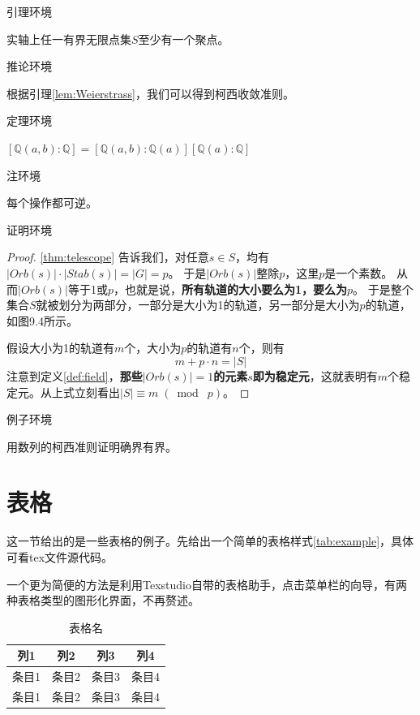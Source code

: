 引理环境
\begin{lemma}\rm{\cite{Azizov2003On}}\label{lem:Weierstrass}
	实轴上任一有界无限点集$S$至少有一个聚点。
\end{lemma}

推论环境
\begin{corollary}
	根据引理\ref{lem:Weierstrass}，我们可以得到柯西收敛准则。
\end{corollary}

定理环境
\begin{theorem}[望远镜公式]\label{thm:telescope}
	$\left[\mathbb{Q}(a, b) : \mathbb{Q}\right]=\left[\mathbb{Q}(a, b) : \mathbb{Q}(a)\right]\left[\mathbb{Q}(a) : \mathbb{Q}\right] $
\end{theorem}

注环境
\begin{remark}\label{rem:reversible}
	每个操作都可逆。
\end{remark}

证明环境
\begin{proof}
	\autoref{thm:telescope} 告诉我们，对任意$s\in S$，均有$\lvert Orb(s)\rvert \cdot \lvert Stab(s)\rvert=\lvert G\rvert=p$。 于是$\lvert Orb(s)\rvert $整除$p$，这里$p$是一个素数。
	从而$\lvert Orb(s)\rvert $等于1或$p$，也就是说，\textbf{所有轨道的大小要么为1，要么为$p$}。
	于是整个集合$S$就被划分为两部分，一部分是大小为1的轨道，另一部分是大小为$p$的轨道，如图9.4所示。
	
	假设大小为1的轨道有$m$个，大小为$p$的轨道有$n$个，则有
	\begin{equation}
		m+p\cdot n=\lvert S\rvert 
	\end{equation}
	注意到定义\ref{def:field}，\textbf{那些$\lvert Orb(s)\rvert =1$的元素$s$即为稳定元}，这就表明有$m$个稳定元。从上式立刻看出$\lvert S \rvert \equiv  m\; (\bmod\; p)$。
\end{proof}
 

例子环境
\begin{example}
	用数列的柯西准则证明确界有界。
\end{example}

\section{表格}

这一节给出的是一些表格的例子。先给出一个简单的表格样式\autoref{tab:example}，具体可看tex文件源代码。

一个更为简便的方法是利用Texstudio自带的表格助手，点击菜单栏的向导，有两种表格类型的图形化界面，不再赘述。
\begin{table}[!htp]
	\centering
	\caption{表格名}
	\begin{tabular}{c|c|c|c}\label{tab:example}
		列1	&	列2	&	列3	&	列4\\
		\hline
		条目1	& 条目2	&	条目3	&	条目4 \\
		条目1	& 条目2	&	条目3	&	条目4 
	\end{tabular}
	\label{table1}
\end{table}

